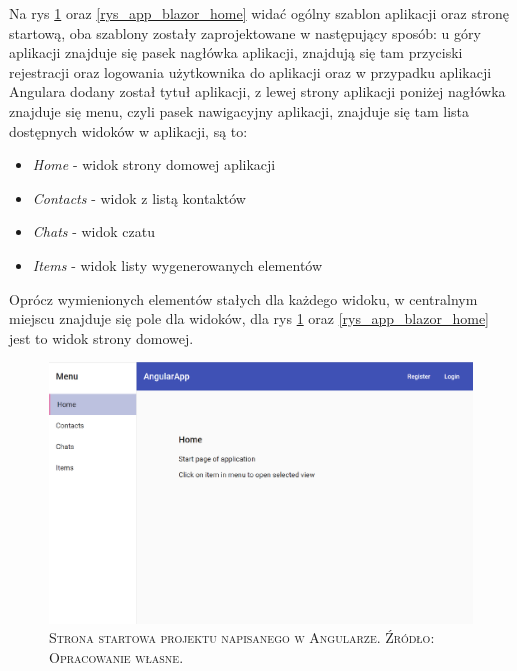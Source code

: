 \documentclass[12pt,a4paper,oneside]{book}
\newcommand{\captionT}[1]{\caption{\textsc{\footnotesize{#1}}}}
\begin{document}
Na rys \ref{rys_app_angular_home} oraz \ref{rys_app_blazor_home} widać ogólny szablon aplikacji oraz stronę startową, oba szablony zostały zaprojektowane w następujący sposób: u góry aplikacji znajduje się pasek nagłówka aplikacji, znajdują się tam przyciski rejestracji oraz logowania użytkownika do aplikacji oraz w przypadku aplikacji Angulara dodany został tytuł aplikacji, z lewej strony aplikacji poniżej nagłówka znajduje się menu, czyli pasek nawigacyjny aplikacji, znajduje się tam lista dostępnych widoków w aplikacji, są to:

\begin{itemize}
  \item \textit{Home} - widok strony domowej aplikacji
  \item \textit{Contacts} - widok z listą kontaktów
  \item \textit{Chats} - widok czatu
  \item \textit{Items} - widok listy wygenerowanych elementów  
\end{itemize}

Oprócz wymienionych elementów stałych dla każdego widoku, w centralnym miejscu znajduje się pole dla widoków, dla rys \ref{rys_app_angular_home} oraz \ref{rys_app_blazor_home} jest to widok strony domowej.

\begin{figure}[H]
\centering
\includegraphics[width=1\textwidth]{images/AngularApp/AngularStronaStartowa.pdf}
\captionT{Strona startowa projektu napisanego w Angularze. Źródło: Opracowanie własne.}
\label{rys_app_angular_home}
\end{figure}
\end{document}
